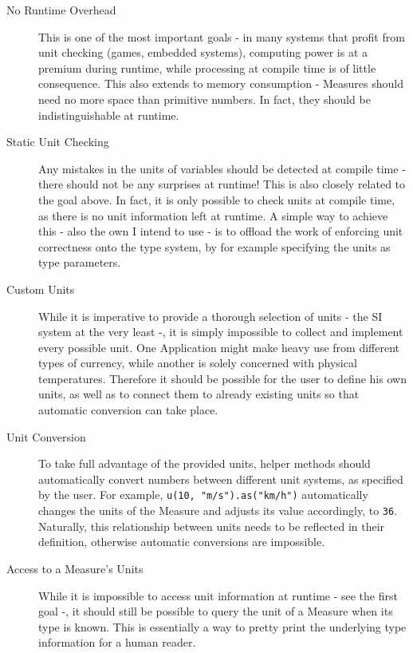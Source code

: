 \documentclass[12pt,oneside,a4paper]{scrbook}
\begin{document}
\begin{description}
  \item[No Runtime Overhead] This is one of the most important goals - in many systems that profit from unit checking (games, embedded systems), computing power is at a premium during runtime, while processing at compile time is of little consequence. This also extends to memory consumption - Measures should need no more space than primitive numbers. In fact, they should be indistinguishable at runtime.

  \item[Static Unit Checking] Any mistakes in the units of variables should be detected at compile time - there should not be any surprises at runtime! This is also closely related to the goal above. In fact, it is only possible to check units at compile time, as there is no unit information left at runtime. A simple way to achieve this - also the own I intend to use - is to offload the work of enforcing unit correctness onto the type system, by for example specifying the units as type parameters.

  \item[Custom Units] While it is imperative to provide a thorough selection of units - the SI system at the very least -, it is simply impossible to collect and implement every possible unit. One Application might make heavy use from different types of currency, while another is solely concerned with physical temperatures. Therefore it should be possible for the user to define his own units, as well as to connect them to already existing units so that automatic conversion can take place.

  \item[Unit Conversion] To take full advantage of the provided units, helper methods should automatically convert numbers between different unit systems, as specified by the user. For example, \verb|u(10, "m/s").as("km/h")| automatically changes the units of the Measure and adjusts its value accordingly, to \verb/36/. Naturally, this relationship between units needs to be reflected in their definition, otherwise automatic conversions are impossible.

  \item[Access to a Measure's Units] While it is impossible to access unit information at runtime - see the first goal -, it should still be possible to query the unit of a Measure when its type is known. This is essentially a way to pretty print the underlying type information for a human reader.


\end{description}
\end{document}
